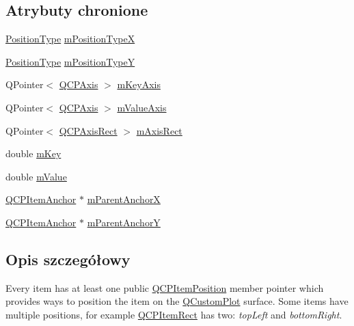 \subsection*{Atrybuty chronione}
\begin{DoxyCompactItemize}
\item 
\hyperlink{class_q_c_p_item_position_aad9936c22bf43e3d358552f6e86dbdc8}{Position\+Type} \hyperlink{class_q_c_p_item_position_ae2a617dce057c5f3ec6878c1823aa291}{m\+Position\+TypeX}
\item 
\hyperlink{class_q_c_p_item_position_aad9936c22bf43e3d358552f6e86dbdc8}{Position\+Type} \hyperlink{class_q_c_p_item_position_a47c96c0ef4380e1af4aaa7c2265c260b}{m\+Position\+TypeY}
\item 
Q\+Pointer$<$ \hyperlink{class_q_c_p_axis}{Q\+C\+P\+Axis} $>$ \hyperlink{class_q_c_p_item_position_a63967a33933231e92f68c8ce06bfc37e}{m\+Key\+Axis}
\item 
Q\+Pointer$<$ \hyperlink{class_q_c_p_axis}{Q\+C\+P\+Axis} $>$ \hyperlink{class_q_c_p_item_position_a505dc2da24ba274452c1c817fcaba011}{m\+Value\+Axis}
\item 
Q\+Pointer$<$ \hyperlink{class_q_c_p_axis_rect}{Q\+C\+P\+Axis\+Rect} $>$ \hyperlink{class_q_c_p_item_position_add40fcb8994c247d85f42a126286b740}{m\+Axis\+Rect}
\item 
double \hyperlink{class_q_c_p_item_position_a4ff3931ad115603dfb4c7000b24bb415}{m\+Key}
\item 
double \hyperlink{class_q_c_p_item_position_a67bf5df69f587d53731724a7d61c6c3f}{m\+Value}
\item 
\hyperlink{class_q_c_p_item_anchor}{Q\+C\+P\+Item\+Anchor} $\ast$ \hyperlink{class_q_c_p_item_position_a41b4641d18c90997b9c01bf304181bf0}{m\+Parent\+AnchorX}
\item 
\hyperlink{class_q_c_p_item_anchor}{Q\+C\+P\+Item\+Anchor} $\ast$ \hyperlink{class_q_c_p_item_position_afc6142a6a09c8fa41c44d3d54fadd737}{m\+Parent\+AnchorY}
\end{DoxyCompactItemize}


\subsection{Opis szczegółowy}
Every item has at least one public \hyperlink{class_q_c_p_item_position}{Q\+C\+P\+Item\+Position} member pointer which provides ways to position the item on the \hyperlink{class_q_custom_plot}{Q\+Custom\+Plot} surface. Some items have multiple positions, for example \hyperlink{class_q_c_p_item_rect}{Q\+C\+P\+Item\+Rect} has two\+: {\itshape top\+Left} and {\itshape bottom\+Right}.

